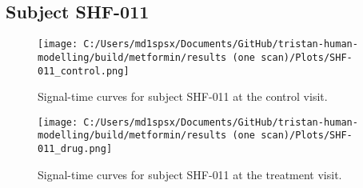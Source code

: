 \documentclass{epflreport}%
\begin{document}
\subsection{Subject SHF{-}011}%
\label{subsec:SubjectSHF{-}011}%

%


\begin{figure}[h!]%
\centering%
\texttt{[image: C:/Users/md1spsx/Documents/GitHub/tristan-human-modelling/build/metformin/results (one scan)/Plots/SHF-011\_control.png]}%
\caption{Signal{-}time curves for subject SHF{-}011 at the control visit.}%
\end{figure}

%


\begin{figure}[h!]%
\centering%
\texttt{[image: C:/Users/md1spsx/Documents/GitHub/tristan-human-modelling/build/metformin/results (one scan)/Plots/SHF-011\_drug.png]}%
\caption{Signal{-}time curves for subject SHF{-}011 at the treatment visit.}%
\end{figure}
\end{document}
